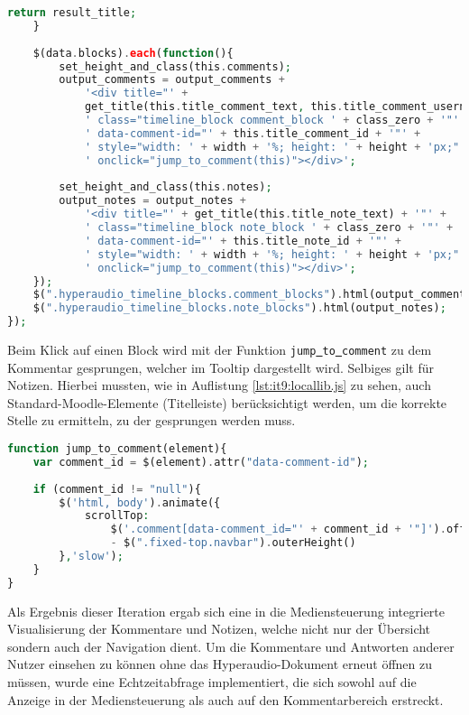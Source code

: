 \begin{lstlisting}[language=php,
             linewidth=\textwidth,
             caption={Ausschnitt der \textbf{hyperaudio.js} in der 9. Iteration},
             label={lst:it9:hyperaudio}]
        return result_title;
    }
		    	
    $(data.blocks).each(function(){
        set_height_and_class(this.comments);
        output_comments = output_comments + 
            '<div title="' + 
            get_title(this.title_comment_text, this.title_comment_username) + '"' +
            ' class="timeline_block comment_block ' + class_zero + '"' +
            ' data-comment-id="' + this.title_comment_id + '"' +
            ' style="width: ' + width + '%; height: ' + height + 'px;"' +
            ' onclick="jump_to_comment(this)"></div>';
                
        set_height_and_class(this.notes);
        output_notes = output_notes +
            '<div title="' + get_title(this.title_note_text) + '"' +
            ' class="timeline_block note_block ' + class_zero + '"' +
            ' data-comment-id="' + this.title_note_id + '"' +
            ' style="width: ' + width + '%; height: ' +	height + 'px;"' +
            ' onclick="jump_to_comment(this)"></div>';
    });
    $(".hyperaudio_timeline_blocks.comment_blocks").html(output_comments);
    $(".hyperaudio_timeline_blocks.note_blocks").html(output_notes);
});
\end{lstlisting}
Beim Klick auf einen Block wird mit der Funktion \texttt{jump\underline{{ }}to\underline{{ }}comment} zu dem Kommentar gesprungen, welcher im Tooltip dargestellt wird. Selbiges gilt für Notizen. Hierbei mussten, wie in Auflistung \ref{lst:it9:locallib.js} zu sehen, auch Standard-Moodle-Elemente (Titelleiste) berücksichtigt werden, um die korrekte Stelle zu ermitteln, zu der gesprungen werden muss.

\begin{lstlisting}[language=php,
             linewidth=\textwidth,
             caption={Ausschnitt der \textbf{locallib.js} in der 9. Iteration},
             label={lst:it9:locallib.js}]
function jump_to_comment(element){
    var comment_id = $(element).attr("data-comment-id");
	
    if (comment_id != "null"){
        $('html, body').animate({
            scrollTop:
                $('.comment[data-comment_id="' + comment_id + '"]').offset().top
                - $(".fixed-top.navbar").outerHeight()
        },'slow');
    }
}
\end{lstlisting}
Als Ergebnis dieser Iteration ergab sich eine in die Mediensteuerung integrierte Visualisierung der Kommentare und Notizen, welche nicht nur der Übersicht sondern auch der Navigation dient. Um die Kommentare und Antworten anderer Nutzer einsehen zu können ohne das Hyperaudio-Dokument erneut öffnen zu müssen, wurde eine Echtzeitabfrage implementiert, die sich sowohl auf die Anzeige in der Mediensteuerung als auch auf den Kommentarbereich erstreckt.


